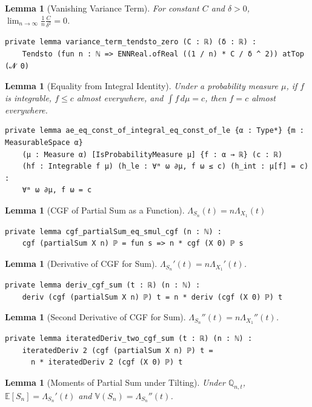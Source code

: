 \documentclass{article}
\newtheorem{lemma}[theorem]{Lemma}
\newcommand{\E}{\mathbb{E}}
\newcommand{\Q}{\mathbb{Q}}
\newcommand{\Var}{\mathbb{V}}
\begin{document}
\begin{lemma}[Vanishing Variance Term]
  For constant $C$ and $\delta > 0$, $\lim_{n\to\infty} \frac{1}{n} \frac{C}{\delta^2} = 0$.
\end{lemma}
\begin{lstlisting}
private lemma variance_term_tendsto_zero (C : ℝ) (δ : ℝ) :
    Tendsto (fun n : ℕ => ENNReal.ofReal ((1 / n) * C / δ ^ 2)) atTop (𝓝 0)
\end{lstlisting}
\begin{lemma}[Equality from Integral Identity]
  Under a probability measure $\mu$, if $f$ is integrable, $f \le c$ almost everywhere, and $\int f \, d\mu = c$, then $f = c$ almost everywhere.
\end{lemma}
\begin{lstlisting}
private lemma ae_eq_const_of_integral_eq_const_of_le {α : Type*} {m : MeasurableSpace α}
    (μ : Measure α) [IsProbabilityMeasure μ] {f : α → ℝ} (c : ℝ)
    (hf : Integrable f μ) (h_le : ∀ᵐ ω ∂μ, f ω ≤ c) (h_int : μ[f] = c) :
    ∀ᵐ ω ∂μ, f ω = c
\end{lstlisting}
\begin{lemma}[CGF of Partial Sum as a Function] $\Lambda_{S_n}(t) = n \Lambda_{X_1}(t)$
\end{lemma}
\begin{lstlisting}
private lemma cgf_partialSum_eq_smul_cgf (n : ℕ) :
    cgf (partialSum X n) ℙ = fun s => n * cgf (X 0) ℙ s
\end{lstlisting}
\begin{lemma}[Derivative of CGF for Sum]
  $\Lambda_{S_n}'(t) = n \Lambda_{X_1}'(t)$.
\end{lemma}
\begin{lstlisting}
private lemma deriv_cgf_sum (t : ℝ) (n : ℕ) :
    deriv (cgf (partialSum X n) ℙ) t = n * deriv (cgf (X 0) ℙ) t
\end{lstlisting}
\begin{lemma}[Second Derivative of CGF for Sum]
  $\Lambda_{S_n}''(t) = n \Lambda_{X_1}''(t)$.
\end{lemma}
\begin{lstlisting}
private lemma iteratedDeriv_two_cgf_sum (t : ℝ) (n : ℕ) :
    iteratedDeriv 2 (cgf (partialSum X n) ℙ) t =
      n * iteratedDeriv 2 (cgf (X 0) ℙ) t
\end{lstlisting}
\begin{lemma}[Moments of Partial Sum under Tilting]
  Under $\Q_{n,t}$, $\E[S_n] = \Lambda_{S_n}'(t)$ and $\Var(S_n) = \Lambda_{S_n}''(t)$.
\end{lemma}
\end{document}
